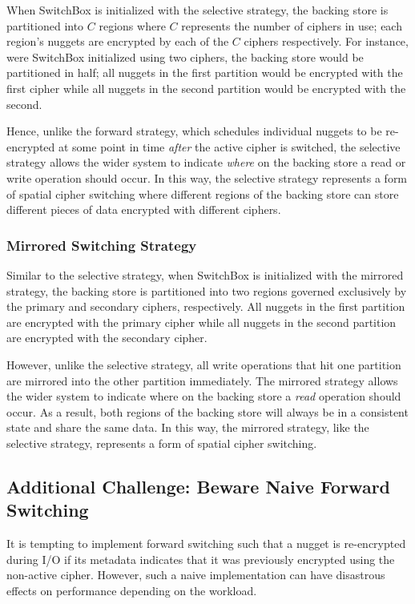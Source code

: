 When SwitchBox is initialized with the selective strategy, the backing store is
partitioned into $C$ regions where $C$ represents the number of ciphers in use;
each region's nuggets are encrypted by each of the $C$ ciphers respectively. For
instance, were SwitchBox initialized using two ciphers, the backing store would
be partitioned in half; all nuggets in the first partition would be encrypted
with the first cipher while all nuggets in the second partition would be
encrypted with the second.

Hence, unlike the forward strategy, which schedules individual nuggets to be
re-encrypted at some point in time \emph{after} the active cipher is switched,
the selective strategy allows the wider system to indicate \emph{where} on the
backing store a read or write operation should occur. In this way, the selective
strategy represents a form of spatial cipher switching where different regions
of the backing store can store different pieces of data encrypted with different
ciphers.

\subsubsection{Mirrored Switching Strategy}

Similar to the selective strategy, when SwitchBox is initialized with the
mirrored strategy, the backing store is partitioned into two regions governed
exclusively by the primary and secondary ciphers, respectively. All nuggets in
the first partition are encrypted with the primary cipher while all nuggets in
the second partition are encrypted with the secondary cipher.

However, unlike the selective strategy, all write operations that hit one
partition are mirrored into the other partition immediately. The mirrored
strategy allows the wider system to indicate where on the backing store a
\emph{read} operation should occur. As a result, both regions of the backing
store will always be in a consistent state and share the same data. In this way,
the mirrored strategy, like the selective strategy, represents a form of spatial
cipher switching.

\subsection{Additional Challenge: Beware Naive Forward Switching}

It is tempting to implement forward switching such that a nugget is re-encrypted
during I/O if its metadata indicates that it was previously encrypted using the
non-active cipher. However, such a naive implementation can have disastrous
effects on performance depending on the workload.

